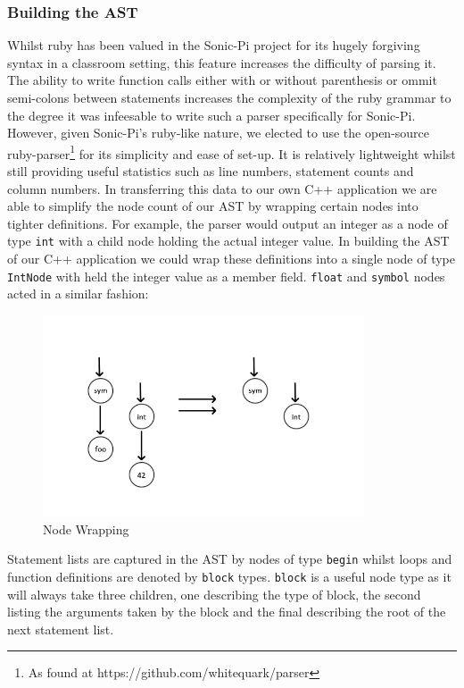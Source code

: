\documentclass[11pt, abstracton, twoside, titlepage=true]{scrartcl}
\begin{document}
\subsubsection{Building the AST}
Whilst ruby has been valued in the Sonic-Pi project for its hugely forgiving
syntax in a classroom setting, this feature increases the difficulty of parsing 
it. The ability to write function calls either with or without parenthesis 
or ommit semi-colons between statements increases the complexity of the ruby 
grammar to the degree it was infeesable to write such a parser specifically 
for Sonic-Pi. However, given Sonic-Pi's ruby-like nature, we elected to use 
the open-source ruby-parser\footnote{As found at https://github.com/whitequark/parser}
for its simplicity and ease of set-up. It is relatively lightweight whilst 
still providing useful statistics such as line numbers, statement counts and
column numbers. In transferring this data to our own C++ application we are 
able to simplify the node count of our AST by wrapping certain nodes into 
tighter definitions. For example, the parser would output an integer as a node 
of type \texttt{int} with a child node holding the actual integer value. In 
building the AST of our C++ application we could wrap these definitions into 
a single node of type \texttt{IntNode} with held the integer value as a 
member field. \texttt{float} and \texttt{symbol} nodes acted in a similar
fashion:

\begin{figure}[h!]
	\centering
	\includegraphics[width=0.85\textwidth]{images/SymInt.jpg}
	\caption{Node Wrapping} \label{symwrap}
\end{figure}

Statement lists are captured in the AST by nodes of type \texttt{begin} whilst
loops and function definitions are denoted by \texttt{block} types. 
\texttt{block} is a useful node type as it will always take three children, 
one describing the type of block, the second listing the arguments taken by 
the block and the final describing the root of the next statement list. 
\end{document}
